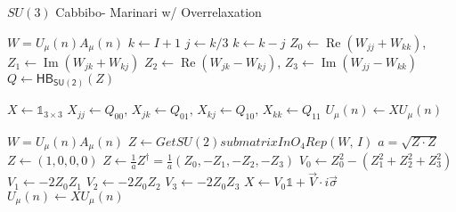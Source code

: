 \documentclass[a4paper,10pt]{book}
\begin{document}
\begin{algorithm}
\caption{$SU(3)$ Cabbibo- Marinari w/ Overrelaxation}\label{alg:HBplusOR}
\begin{algorithmic}



\State $W = U_\mu(n)A_\mu(n)$
  \State $k \gets I+1$
\State $j \gets k / 3$ 
\State $k \gets k - j$ 
\State $Z_0 \gets \operatorname{Re}\left( W_{jj} + W_{kk} \right)$, $Z_1 \gets \operatorname{Im}\left( W_{jk} + W_{kj} \right)$
\State $Z_2 \gets \operatorname{Re}\left( W_{jk} - W_{kj} \right)$, $Z_3\gets \operatorname{Im}\left( W_{jj} - W_{kk} \right)$
\EndProcedure
\State $Q \gets \mathsf{HB_{SU(2)}} \left( Z \right)$ 

\State $X \gets \mathbb{1}_{3\times 3}$
\State $X_{jj} \gets Q_{00},\,X_{jk} \gets Q_{01},\,X_{kj} \gets Q_{10},\,X_{kk} \gets Q_{11}$
\State $U_\mu(n) \gets XU_\mu(n)$
\EndFor
\EndFor




\State $W = U_\mu(n)A_\mu(n)$
\State $Z \gets GetSU(2)submatrixInO_4Rep(W,\, I)$
\State $a=\sqrt{Z\cdot Z}$
\State $Z \gets (1,0,0,0)$
\Else
\State $Z \gets \frac{1}{a}Z^\dagger = \frac{1}{a}\left( Z_0,-Z_1,-Z_2,-Z_3 \right)$
\State{}
\State $V_0 \gets Z_0^2-(Z_1^2+Z_2^2+Z_3^2)$
\State $V_1 \gets -2Z_0Z_1$
\State $V_2 \gets -2Z_0Z_2$
\State $V_3 \gets -2Z_0Z_3$
\State $X \gets V_0\mathbb{1}+\vec{V}\cdot i\vec{\sigma}$
\State $U_\mu(n) \gets XU_\mu(n)$
\EndIf
\EndFor
\EndFor
\EndWhile
\EndWhile
\end{algorithmic}
\end{algorithm}
\end{document}
